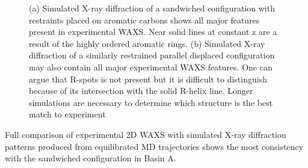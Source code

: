 \documentclass{article}
\begin{document}
\begin{figure}
\begin{subfigure}{0.475\textwidth}
		\caption{}\label{fig:rzoffsetrestrained}
	\end{subfigure}
	\caption{(a) Simulated X-ray diffraction of a sandwiched configuration
	with restraints placed on aromatic carbons shows all major features
	present in experimental WAXS. Near solid lines at constant z are a result of 
	the highly ordered aromatic rings. (b) Simulated X-ray diffraction of a similarly
	restrained parallel displaced configuration may also contain all
	major experimental WAXS features. One can argue that R-spots is not present
	but it is difficult to distinguish because of its intersection with the solid
	R-helix line. Longer simulations are necessary to determine which structure
	is the best match to experiment}\label{fig:XRDrestrained}
  \end{figure}
  
  Full comparison of experimental 2D WAXS with simulated X-ray diffraction
  patterns produced from equilibrated MD trajectories shows the most consistency
  with the sandwiched configuration in Basin A.
  
\end{document}
